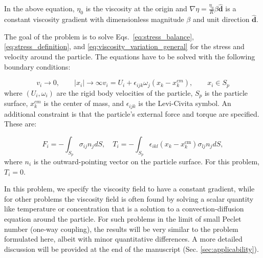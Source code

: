 \documentclass{jfm}
\begin{document}
In the above equation, $\eta_0$ is the viscosity at the origin and $\nabla \eta = \frac{\eta_0}{R} \beta \boldsymbol{\hat{d}}$ is a constant viscosity gradient with dimensionless magnitude $\beta$ and unit direction $\boldsymbol{\hat{d}}$. 

The goal of the problem is to solve Eqs.~\eqref{eq:stress_balance}, \eqref{eq:stress_definition}, and \eqref{eq:viscosity_variation_general}  for the stress and velocity around the particle.  The equations have to be solved with the following boundary conditions:


\begin{subequations}
\begin{equation} \label{eq:velocity_boundary_1}
    v_i \rightarrow 0, \qquad |x_i| \rightarrow \infty
\end{equation}
\begin{equation}
v_i=U_i+\epsilon_{ijk}\omega_j  (x_k-x_k^{cm}),    \qquad x_i \in S_p
\end{equation}
\end{subequations}
where $(U_i,\omega_i)$ are the rigid body velocities of the particle, $S_p$ is the particle surface, $x_k^{cm}$ is the center of mass, and $\epsilon_{ijk}$ is the Levi-Civita symbol. An additional constraint is that the particle's external force and torque are specified.  These are:

 \begin{equation} \label{eqn:force_torque_defn}
     F_i = -\int_{S_p}\sigma_{ij}n_jdS, \quad 
     T_i = -\int_{S_p}\epsilon_{ikl}(x_k-x_k^{\text{cm}})\sigma_{lj}n_jdS,
 \end{equation}
where $n_i$ is the outward-pointing vector on the particle surface. For this problem, $T_i =0$.


 In this problem, we specify the viscosity field to have a constant gradient, while for other problems the viscosity field is often found by solving a scalar quantity like temperature or concentration that is a solution to a convection-diffusion equation around the particle.  For such problems in the limit of small Peclet number (one-way coupling), the results will be very similar to the problem formulated here, albeit with minor quantitative differences.  A more detailed discussion will be provided at the end of the manuscript (Sec. \ref{sec:applicability}).
\end{document}
